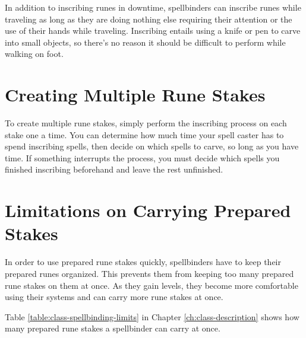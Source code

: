 In addition to inscribing runes in downtime, spellbinders can inscribe runes while traveling as long as they are doing nothing else requiring their attention or the use of their hands while traveling. Inscribing entails using a knife or pen to carve into small objects, so there's no reason it should be difficult to perform while walking on foot.

\section{Creating Multiple Rune Stakes}

To create multiple rune stakes, simply perform the inscribing process on each stake one a time. You can determine how much time your spell caster has to spend inscribing spells, then decide on which spells to carve, so long as you have time. If something interrupts the process, you must decide which spells you finished inscribing beforehand and leave the rest unfinished.

\section{Limitations on Carrying Prepared Stakes}

In order to use prepared rune stakes quickly, spellbinders have to keep their prepared runes organized. This prevents them from keeping too many prepared rune stakes on them at once. As they gain levels, they become more comfortable using their systems and can carry more rune stakes at once.

Table \ref{table:class-spellbinding-limits} in Chapter \ref{ch:class-description} shows how many prepared rune stakes a spellbinder can carry at once.